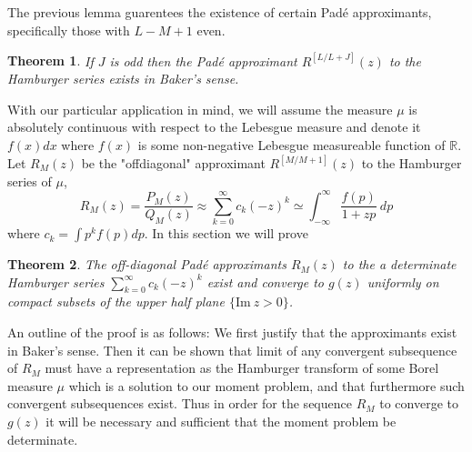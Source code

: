 \documentclass{amsart}
\newtheorem{theorem}{Theorem}[section]
\theoremstyle{remark}
\numberwithin{equation}{section}
\newcommand{\tc}{\textcolor{blue}}
\newcommand{\RR}{\mathbb{R}}
\begin{document}
The previous lemma guarentees the existence of certain Pad\'e approximants, specifically those with $L-M+1$ even. 
\begin{theorem}
    If $J$ is odd then the Pad\'e approximant $R^{[L/L+J]}(z)$ to the Hamburger series exists in Baker's sense.
\end{theorem}


With our particular application in mind, we will assume the measure $\mu$ is absolutely continuous with respect to the Lebesgue measure and denote it $f(x)dx$ where $f(x)$ is some non-negative Lebesgue measureable function of $\RR$. Let $R_M(z)$ be the "offdiagonal" approximant $R^{[M/M+1]}(z)$ to the Hamburger series of $\mu$,
\[
    R_M(z) = \frac{P_M(z)}{Q_M(z)} \approx \sum_{k=0}^\infty c_k(-z)^k \simeq \int_{-\infty}^\infty \frac{f(p)}{1 + zp} ~dp
\]
where $c_k = \int p^k f(p) dp$. In this section we will prove

\begin{theorem}
    The off-diagonal Pad\'e approximants $R_M(z)$ to the a determinate Hamburger series $\sum_{k=0}^\infty c_k(-z)^k$ exist and converge to $g(z)$ uniformly on compact subsets of the upper half plane $\{\text{Im} ~z > 0\}$.
\end{theorem}

An outline of the proof is as follows: We first justify that the approximants exist in Baker's sense. Then it can be shown that limit of any convergent subsequence of $R_M$ must have a representation as the Hamburger transform of some Borel measure $\mu$ which is a solution to our moment problem, and that furthermore such convergent subsequences exist. Thus in order for the sequence $R_M$ to converge to $g(z)$ it will be necessary and sufficient that the moment problem be determinate.

\end{document}
